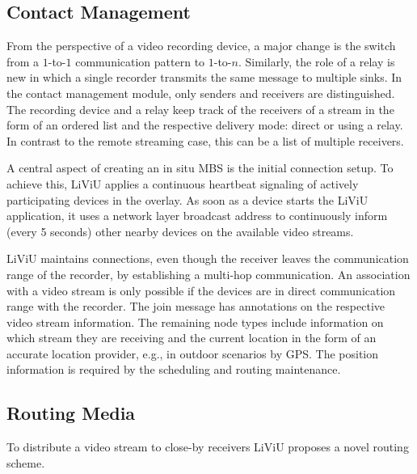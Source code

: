 \subsection{Contact Management}
From the perspective of a video recording device, a major change is the switch from a $1$-to-$1$ communication pattern to $1$-to-$n$. 
Similarly, the role of a relay is new in which a single recorder transmits the same message to multiple sinks.
In the contact management module, only senders and receivers are distinguished.
The recording device and a relay keep track of the receivers of a stream in the form of an ordered list and the respective delivery mode: direct or using a relay.
In contrast to the remote streaming case, this can be a list of multiple receivers.

A central aspect of creating an in situ \ac{MBS} is the initial connection setup.
To achieve this, \ac{LiViU} applies a continuous heartbeat signaling of actively participating devices in the overlay.
As soon as a device starts the \ac{LiViU} application, it uses a network layer broadcast address to continuously inform (every 5 seconds) other nearby devices on the available video streams.

\ac{LiViU} maintains connections, even though the receiver leaves the communication range of the recorder, by establishing a multi-hop communication.
An association with a video stream is only possible if the devices are in direct communication range with the recorder.
The join message has annotations on the respective video stream information. 
The remaining node types include information on which stream they are receiving and the current location in the form of an accurate location provider, e.g., in outdoor scenarios by \ac{GPS}.
The position information is required by the scheduling and routing maintenance. 
\subsection{Routing Media}
To distribute a video stream to close-by receivers \ac{LiViU} proposes a novel routing scheme.
